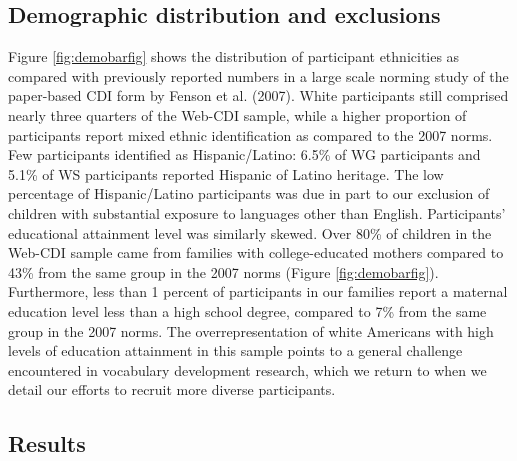 \documentclass[
  english,
  ,man,floatsintext]{apa6}
\begin{document}
\hypertarget{demographic-distribution-and-exclusions}{%
\subsection{Demographic distribution and exclusions}\label{demographic-distribution-and-exclusions}}

Figure \ref{fig:demobarfig} shows the distribution of participant ethnicities as compared with previously reported numbers in a large scale norming study of the paper-based CDI form by Fenson et al. (2007). White participants still comprised nearly three quarters of the Web-CDI sample, while a higher proportion of participants report mixed ethnic identification as compared to the 2007 norms. Few participants identified as Hispanic/Latino: 6.5\% of WG participants and 5.1\% of WS participants reported Hispanic of Latino heritage. The low percentage of Hispanic/Latino participants was due in part to our exclusion of children with substantial exposure to languages other than English. Participants' educational attainment level was similarly skewed. Over 80\% of children in the Web-CDI sample came from families with college-educated mothers compared to 43\% from the same group in the 2007 norms (Figure \ref{fig:demobarfig}). Furthermore, less than 1 percent of participants in our families report a maternal education level less than a high school degree, compared to 7\% from the same group in the 2007 norms. The overrepresentation of white Americans with high levels of education attainment in this sample points to a general challenge encountered in vocabulary development research, which we return to when we detail our efforts to recruit more diverse participants.

\hypertarget{results}{%
\subsection{Results}\label{results}}
\end{document}
